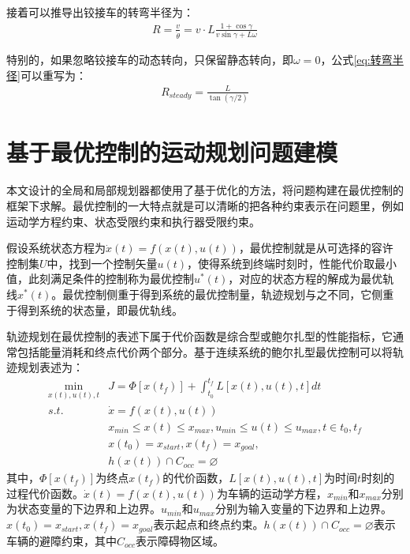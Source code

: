\documentclass[master,academic]{ysuthesis} %
\begin{document}
	接着可以推导出铰接车的转弯半径为：
	\begin{equation}
		\begin{aligned}
			R = \frac{v}{\dot{\theta}} = v\cdot L \frac{1+\cos\gamma}{v\sin\gamma+L\omega }
		\end{aligned}
		\label{eq:转弯半径}
	\end{equation}


	特别的，如果忽略铰接车的动态转向，只保留静态转向，即$\omega=0$，公式\ref{eq:转弯半径}可以重写为：
	\begin{equation}
		\begin{aligned}
			R_{steady} = \frac{L}{\tan(\gamma/2)} 
		\end{aligned}
	\end{equation}
		
	\section{基于最优控制的运动规划问题建模}
	本文设计的全局和局部规划器都使用了基于优化的方法，将问题构建在最优控制的框架下求解。最优控制的一大特点就是可以清晰的把各种约束表示在问题里，例如运动学方程约束、状态受限约束和执行器受限约束。
	
	假设系统状态方程为$\dot{x}(t)=f(x(t),u(t))$，最优控制就是从可选择的容许控制集$U$中，找到一个控制矢量$u(t)$，使得系统到终端时刻时，性能代价取最小值，此刻满足条件的控制称为最优控制$u^{*}(t)$，对应的状态方程的解成为最优轨线$x^{*}(t)$。最优控制侧重于得到系统的最优控制量，轨迹规划与之不同，它侧重于得到系统的状态量，即最优轨线。
	
	轨迹规划在最优控制的表述下属于代价函数是综合型或鲍尔扎型的性能指标，它通常包括能量消耗和终点代价两个部分。基于连续系统的鲍尔扎型最优控制可以将轨迹规划表述为：
	\begin{equation}
		\begin{aligned}
			\min_{x(t),u(t),t} &J = \Phi[x(t_f)]+\int_{t_0}^{t_f}L[x(t),u(t),t]dt\\
			s.t. \ \ \ &\dot{x} = f(x(t),u(t))\\
			&x_{min}\le x(t) \le x_{max},u_{min}\le u(t) \le u_{max},t \in{t_0,t_f}\\
			&x(t_0)=x_{start},x(t_f)=x_{goal},\\
			&h(x(t))\cap C_{occ}=\varnothing 
		\end{aligned}
	\end{equation}
	其中，$\Phi[x(t_f)]$为终点$x(t_f)$的代价函数，$L[x(t),u(t),t]$为时间$t$时刻的过程代价函数。$\dot{x}(t)=f(x(t),u(t))$为车辆的运动学方程，$x_{min}$和$x_{max}$分别为状态变量的下边界和上边界。$u_{min}$和$u_{max}$分别为输入变量的下边界和上边界。$x(t_0)=x_{start},x(t_f)=x_{goal}$表示起点和终点约束。$h(x(t))\cap C_{occ}=\varnothing$表示车辆的避障约束，其中$C_{occ}$表示障碍物区域。
	
\end{document}
